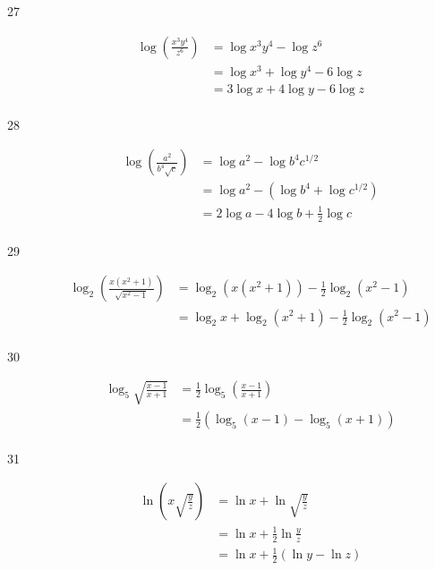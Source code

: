 \documentclass{exam}
\begin{document}
\begin{description}
      \item[27] 
        \begin{align*}
          \log \left( \frac{x^3y^4}{z^6} \right) &= \log x^3y^4 - \log z^6 \\
                                                 &= \log x^3 + \log y^4 - 6 \log z \\
                                                 &= 3 \log x + 4 \log y - 6 \log z \\
        \end{align*}

      \item[28] 
        \begin{align*}
          \log \left( \frac{a^2}{b^4 \sqrt{c}} \right) &= \log a^2 - \log b^4 c^{1/2} \\
                                                       &= \log a^2 - \left( \log b^4 + \log c^{1/2} \right) \\
                                                       &= 2 \log a - 4 \log b + \frac{1}{2} \log c \\
        \end{align*}

      \item[29] 
        \begin{align*}
          \log_2 \left( \frac{x \left( x^2 + 1 \right)}{\sqrt{x^2 - 1}} \right)
            &= \log_2 \left( x \left( x^2 + 1 \right) \right) - \frac{1}{2} \log_2 \left( x^2 - 1 \right) \\
            &= \log_2 x + \log_2 \left( x^2 + 1 \right) - \frac{1}{2} \log_2 \left( x^2 - 1 \right) \\
        \end{align*}

      \item[30] 
        \begin{align*}
          \log_5 \sqrt{ \frac{x - 1}{x + 1}} &= \frac{1}{2} \log_5 \left( \frac{x - 1}{x + 1} \right) \\
                                             &= \frac{1}{2} \left( \log_5 (x - 1) - \log_5 (x + 1) \right) \\
        \end{align*}

      \item[31] 
        \begin{align*}
          \ln \left( x \sqrt{ \frac{y}{z}} \right) &= \ln x + \ln \sqrt{ \frac{y}{z}} \\
                                                   &= \ln x + \frac{1}{2} \ln \frac{y}{z} \\
                                                   &= \ln x + \frac{1}{2} (\ln y - \ln z) \\
        \end{align*}


\end{description}
\end{document}
